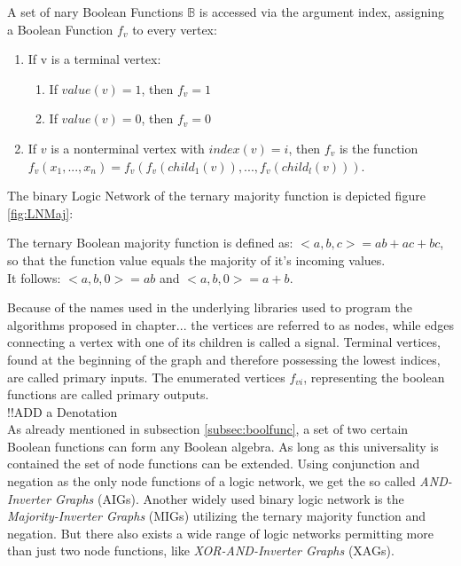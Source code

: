\begin{definition}
	A set of nary Boolean Functions $\mathbb{B}$ is accessed via the argument index, assigning a Boolean Function $f_v$ to every vertex:
	\begin{enumerate}
		\item If v is a terminal vertex:
		\begin{enumerate}
			\item If $value(v)=1$, then $f_v=1$
			\item If $value(v)=0$, then $f_v=0$
		\end{enumerate}
		\item If $v$ is a nonterminal vertex with $index(v)=i$, then $f_v$ is the function \\ 
		$f_v(x_1, ..., x_n) = f_v(f_v(child_1(v)), ..., f_v(child_l(v)))$.
	\end{enumerate}
\end{definition}

The binary Logic Network of the ternary majority function is depicted figure \ref*{fig:LNMaj}:

\begin{definition}
	The ternary Boolean majority function is defined as: $<a, b, c> = ab + ac + bc$, so that the function value equals the majority of it's incoming values.\\
	It follows: $<a, b, 0> = ab$ and $<a, b, 0> = a + b$.
\end{definition}

Because of the names used in the underlying libraries used to program the algorithms proposed in chapter... the vertices are referred to as nodes, while edges connecting a vertex with one of its children is called a signal. Terminal vertices, found at the beginning of the graph and therefore possessing the lowest indices, are called primary inputs. The enumerated vertices $f_{vi}$, representing the boolean functions are called primary outputs.\\
!!ADD a Denotation\\
As already mentioned in subsection \ref{subsec:boolfunc}, a set of two certain Boolean functions can form any Boolean algebra.
As long as this universality is contained the set of node functions can be extended. Using conjunction and negation as the only node functions of a logic network, we get the so called \textit{AND-Inverter Graphs} (AIGs). Another widely used binary logic network is the \textit{Majority-Inverter Graphs} (MIGs) utilizing the ternary majority function and negation. But there also exists a wide range of logic networks permitting more than just two node functions, like \textit{XOR-AND-Inverter Graphs} (XAGs).\\

